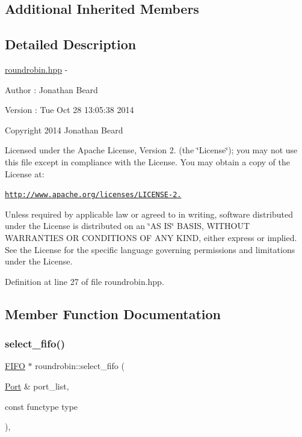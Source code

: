 \subsection*{Additional Inherited Members}


\subsection{Detailed Description}
\hyperlink{roundrobin_8hpp_source}{roundrobin.\+hpp} -\/ \begin{DoxyAuthor}{Author}
\+: Jonathan Beard 
\end{DoxyAuthor}
\begin{DoxyVersion}{Version}
\+: Tue Oct 28 13\+:05\+:38 2014
\end{DoxyVersion}
Copyright 2014 Jonathan Beard

Licensed under the Apache License, Version 2. (the \char`\"{}\+License\char`\"{}); you may not use this file except in compliance with the License. You may obtain a copy of the License at\+:

\href{http://www.apache.org/licenses/LICENSE-2.0}{\tt http\+://www.\+apache.\+org/licenses/\+L\+I\+C\+E\+N\+S\+E-\/2.}

Unless required by applicable law or agreed to in writing, software distributed under the License is distributed on an \char`\"{}\+A\+S I\+S\char`\"{} B\+A\+S\+IS, W\+I\+T\+H\+O\+UT W\+A\+R\+R\+A\+N\+T\+I\+ES OR C\+O\+N\+D\+I\+T\+I\+O\+NS OF A\+NY K\+I\+ND, either express or implied. See the License for the specific language governing permissions and limitations under the License. 

Definition at line 27 of file roundrobin.\+hpp.



\subsection{Member Function Documentation}
\hypertarget{classroundrobin_acd670a96e62905062e50b21c3d5d64c5}{}\label{classroundrobin_acd670a96e62905062e50b21c3d5d64c5} 
\subsubsection{\texorpdfstring{select\+\_\+fifo()}{select\_fifo()}}
{\footnotesize\ttfamily \hyperlink{class_f_i_f_o}{F\+I\+FO} $\ast$ roundrobin\+::select\+\_\+fifo (\begin{DoxyParamCaption}\item[{\hyperlink{class_port}{Port} \&}]{port\+\_\+list,  }\item[{const functype}]{type }\end{DoxyParamCaption})\hspace{0.3cm}{\ttfamily [protected]}, {\ttfamily [virtual]}}

